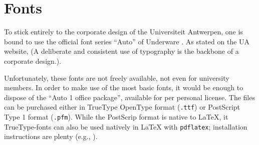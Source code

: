 \section{Fonts}

To stick entirely to the corporate design of the Universiteit Antwerpen, one is bound to use the official font series \enquote{Auto} of Underware \cite{Underware::ATI}. As stated on the UA website,  (A deliberate and consistent use of typography is the backbone of a corporate design.). 

Unfortunately, these fonts are not freely available, not even for university members. In order to make use of the most basic fonts, it would be enough to dispose of the \enquote{Auto 1 office package}, available for  per personal license. The files can be purchased either in TrueType OpenType format (\lstinline!.ttf!) or PostScript Type 1 format (\lstinline!.pfm!). While the PostScrip format is native to \LaTeX{}, it TrueType-fonts can also be used natively in \LaTeX{} with \lstinline!pdflatex!; installation instructions are plenty (e.g., \cite{Rakityansky::TTF}).



